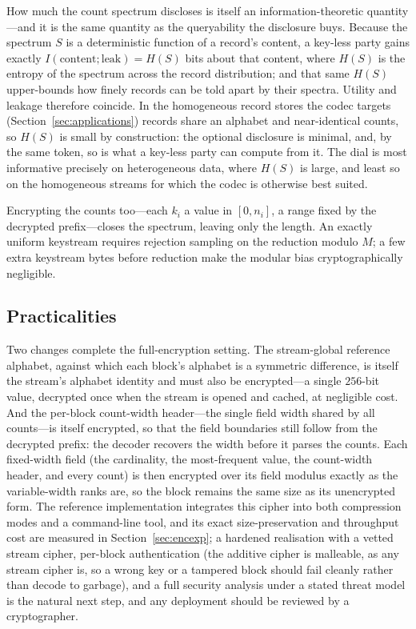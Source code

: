 \documentclass[entropy,article,submit,oneauthor,pdftex]{Definitions/mdpi}
\begin{document}
How much the count spectrum discloses is itself an information-theoretic quantity---and it is
the same quantity as the queryability the disclosure buys. Because the spectrum $S$ is a
deterministic function of a record's content, a key-less party gains exactly
$I(\text{content};\text{leak})=H(S)$ bits about that content, where $H(S)$ is the entropy of
the spectrum across the record distribution; and that same $H(S)$ upper-bounds how finely
records can be told apart by their spectra. Utility and leakage therefore coincide. In the
homogeneous record stores the codec targets (Section~\ref{sec:applications}) records share an
alphabet and near-identical counts, so $H(S)$ is small by construction: the optional
disclosure is minimal, and, by the same token, so is what a key-less party can compute from
it. The dial is most informative precisely on heterogeneous data, where $H(S)$ is large, and
least so on the homogeneous streams for which the codec is otherwise best suited.

Encrypting the counts too---each $k_i$ a
value in $[0,n_i]$, a range fixed by the decrypted prefix---closes the spectrum, leaving
only the length. An exactly uniform keystream requires
rejection sampling on the reduction modulo $M$; a few extra keystream bytes before reduction
make the modular bias cryptographically negligible.

\subsection{Practicalities}
Two changes complete the full-encryption setting. The stream-global reference
alphabet, against which each block's alphabet is a symmetric difference, is itself the
stream's alphabet identity and must also be encrypted---a single $256$-bit value,
decrypted once when the stream is opened and cached, at negligible cost. And the
per-block count-width header---the single field width shared by all counts---is
itself encrypted, so that the field boundaries still follow from the decrypted
prefix: the decoder recovers the width before it parses the counts. Each fixed-width
field (the cardinality, the most-frequent value, the count-width header, and every
count) is then encrypted over its field modulus exactly as the variable-width ranks
are, so the block remains the same size as its unencrypted form. The reference
implementation integrates this cipher into both compression modes and a
command-line tool, and its exact size-preservation and throughput cost are measured
in Section~\ref{sec:encexp}; a
hardened realisation with a vetted stream cipher, per-block authentication (the
additive cipher is malleable, as any stream cipher is, so a wrong key or a tampered
block should fail cleanly rather than decode to garbage), and a full security analysis
under a stated threat model is the natural next step, and any deployment should be
reviewed by a cryptographer.
\end{document}

